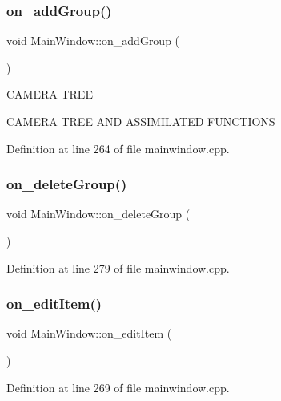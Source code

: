 \subsubsection{\texorpdfstring{on\_addGroup()}{on\_addGroup()}}
{\footnotesize\ttfamily void Main\+Window\+::on\+\_\+add\+Group (\begin{DoxyParamCaption}{ }\end{DoxyParamCaption})\hspace{0.3cm}{\ttfamily [protected]}}

C\+A\+M\+E\+RA T\+R\+EE

C\+A\+M\+E\+RA T\+R\+EE A\+ND A\+S\+S\+I\+M\+I\+L\+A\+T\+ED F\+U\+N\+C\+T\+I\+O\+NS 

Definition at line 264 of file mainwindow.\+cpp.

\mbox{\label{class_main_window_a6b3dcc79316502d1d6ecb230312e62c8}} 
\subsubsection{\texorpdfstring{on\_deleteGroup()}{on\_deleteGroup()}}
{\footnotesize\ttfamily void Main\+Window\+::on\+\_\+delete\+Group (\begin{DoxyParamCaption}{ }\end{DoxyParamCaption})\hspace{0.3cm}{\ttfamily [protected]}}



Definition at line 279 of file mainwindow.\+cpp.

\mbox{\label{class_main_window_a5f6c4aa27d5540a3e7f17d8fd88ded3f}} 
\subsubsection{\texorpdfstring{on\_editItem()}{on\_editItem()}}
{\footnotesize\ttfamily void Main\+Window\+::on\+\_\+edit\+Item (\begin{DoxyParamCaption}{ }\end{DoxyParamCaption})\hspace{0.3cm}{\ttfamily [protected]}}



Definition at line 269 of file mainwindow.\+cpp.

